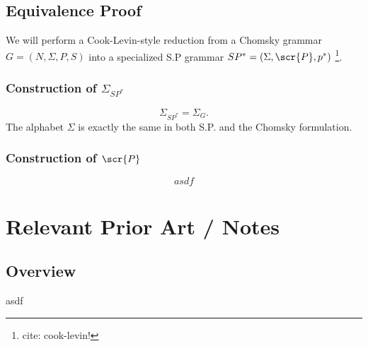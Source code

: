 \documentclass[10pt]{article}
\newcommand{\todocite}[1]{\footnote{cite: #1}}
\begin{document}
\subsection{Equivalence Proof}
\label{sec:equivalence-proof}
We will perform a Cook-Levin-style reduction from a Chomsky grammar $G = (N, \Sigma, P, S)$  into a specialized S.P grammar $SP^* = (\Sigma, \scr{P}, p^*)$  \todocite{cook-levin!}.

\subsubsection{Construction of $\Sigma_{SP^*}$}
\label{sec:construction-of-sigma}
\begin{equation}\label{eq:alphabet}
  \Sigma_{SP^*} = \Sigma_G.
\end{equation}
The alphabet $\Sigma$ is exactly the same in both S.P. and the Chomsky formulation.

\subsubsection{Construction of $\scr{P}$}
\label{sec:construction-of-p}
\begin{equation}
  \label{eq:productions-reduction}
  asdf
\end{equation}

\section{Relevant Prior Art / Notes}
\subsection{Overview}
\label{sec:overview}

asdf
\end{document}
